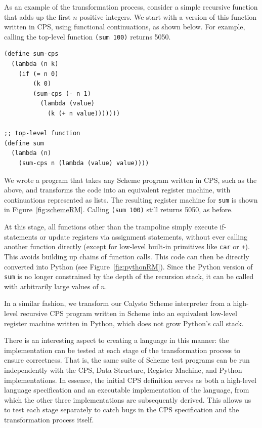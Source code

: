 \documentclass[acmsmall,screen,authorversion]{acmart}
\begin{document}
As an example of the transformation process, consider a simple recursive
function that adds up the first $n$ positive integers.  We start with a version
of this function written in CPS, using functional continuations, as shown
below.  For example, calling the top-level function \texttt{(sum 100)} returns
5050.

{\footnotesize
\begin{verbatim}
(define sum-cps
  (lambda (n k)
    (if (= n 0)
        (k 0)
        (sum-cps (- n 1)
          (lambda (value)
            (k (+ n value)))))))

;; top-level function
(define sum
  (lambda (n)
    (sum-cps n (lambda (value) value))))
\end{verbatim}
}

\noindent
We wrote a program that takes any Scheme program written in CPS, such as the
above, and transforms the code into an equivalent register machine, with
continuations represented as lists.  The resulting register machine for
\texttt{sum} is shown in Figure~\ref{fig:schemeRM}.  Calling \texttt{(sum 100)}
still returns 5050, as before.

At this stage, all functions other than the trampoline simply execute
if-statements or update registers via assignment statements, without ever
calling another function directly (except for low-level built-in primitives
like \texttt{car} or \texttt{+}).  This avoids building up chains of function
calls.  This code can then be directly converted into Python (see
Figure~\ref{fig:pythonRM}).  Since the Python version of \texttt{sum} is no
longer constrained by the depth of the recursion stack, it can be called with
arbitrarily large values of $n$.

In a similar fashion, we transform our Calysto Scheme interpreter from a
high-level recursive CPS program written in Scheme into an equivalent low-level
register machine written in Python, which does not grow Python's call stack.

There is an interesting aspect to creating a language in this manner: the
implementation can be tested at each stage of the transformation process to
ensure correctness. That is, the same suite of Scheme test programs can be run
independently with the CPS, Data Structure, Register Machine, and Python
implementations. In essence, the initial CPS definition serves as both a
high-level language specification and an executable implementation of the
language, from which the other three implementations are subsequently
derived. This allows us to test each stage separately to catch bugs in the CPS
specification and the transformation process itself.
\end{document}
